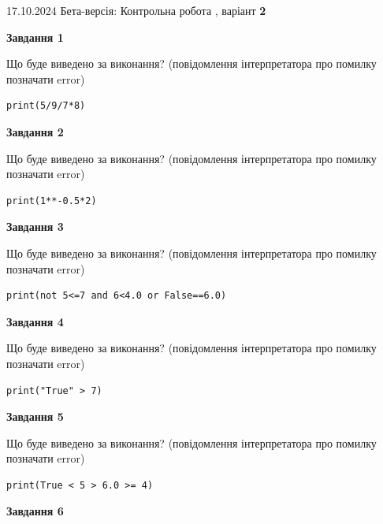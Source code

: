 \documentclass[12pt, ukrainian]{article}
\begin{document}
{\Large{17.10.2024 Бета-версія: Контрольна робота , варіант  \No \textbf { 2 }\par}}
{
\begin {large}
{\begin {center}\textbf{Завдання 1}\end {center}}

Що буде виведено за виконання? (повідомлення інтерпретатора про помилку позначати error)\par
\begin{verbatim}
print(5/9/7*8)
\end{verbatim}

{\begin {center}\textbf{Завдання 2}\end {center}}

Що буде виведено за виконання? (повідомлення інтерпретатора про помилку позначати error)\par
\begin{verbatim}
print(1**-0.5*2)
\end{verbatim}

{\begin {center}\textbf{Завдання 3}\end {center}}

Що буде виведено за виконання? (повідомлення інтерпретатора про помилку позначати error)\par
\begin{verbatim}
print(not 5<=7 and 6<4.0 or False==6.0)
\end{verbatim}

{\begin {center}\textbf{Завдання 4}\end {center}}

Що буде виведено за виконання? (повідомлення інтерпретатора про помилку позначати error)\par
\begin{verbatim}
print("True" > 7)
\end{verbatim}

{\begin {center}\textbf{Завдання 5}\end {center}}

Що буде виведено за виконання? (повідомлення інтерпретатора про помилку позначати error)\par
\begin{verbatim}
print(True < 5 > 6.0 >= 4)
\end{verbatim}

{\begin {center}\textbf{Завдання 6}\end {center}}


\end{large}}
\end{document}
